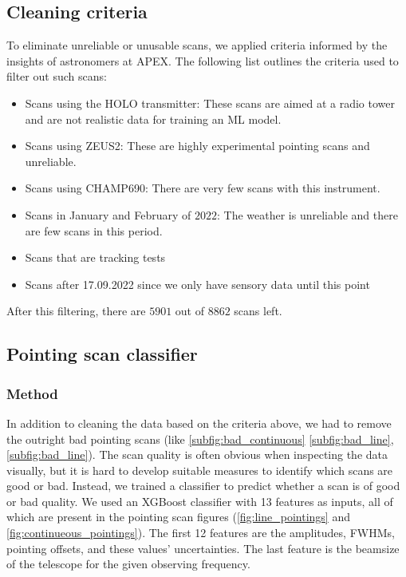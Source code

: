 \subsection{Cleaning criteria}
To eliminate unreliable or unusable scans, we applied criteria informed by the insights of astronomers at APEX.
The following list outlines the criteria used to filter out such scans:
\begin{itemize}
    \item Scans using the HOLO transmitter:
    These scans are aimed at a radio tower and are not realistic data for training an ML model.
    \item Scans using ZEUS2:
    These are highly experimental pointing scans and unreliable.
    \item Scans using CHAMP690: There are very few scans with this instrument.
    \item Scans in January and February of $2022$: The weather is unreliable and there are few scans in this period.
    \item Scans that are tracking tests
    \item Scans after 17.09.2022 since we only have sensory data until this point
\end{itemize}   
After this filtering, there are $5901$ out of $8862$ scans left.
        
\subsection{Pointing scan classifier} 
\subsubsection{Method}
In addition to cleaning the data based on the criteria above, we had to remove the outright bad pointing scans (like \ref{subfig:bad_continuous} \ref{subfig:bad_line}, \ref{subfig:bad_line}).
The scan quality is often obvious when inspecting the data visually, but it is hard to develop suitable measures to identify which scans are good or bad.
Instead, we trained a classifier to predict whether a scan is of good or bad quality.
We used an XGBoost classifier with 13 features as inputs, all of which are present in the pointing scan figures (\ref{fig:line_pointings} and \ref{fig:continueous_pointings}).
The first 12 features are the amplitudes, FWHMs, pointing offsets, and these values' uncertainties.
The last feature is the beamsize of the telescope for the given observing frequency.\\

